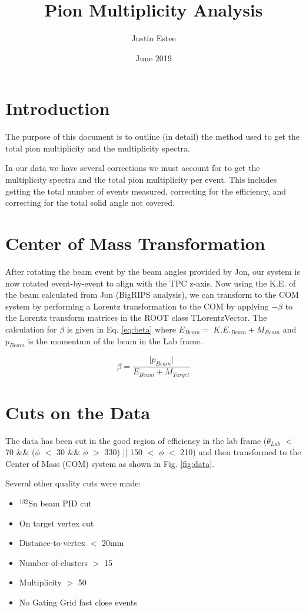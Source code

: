 \documentclass[12pt, letterpaper, twoside]{article}
\title{Pion Multiplicity Analysis}
\author{Justin Estee}
\date{June 2019}
\begin{document}
 
\begin{titlepage}
\maketitle
\end{titlepage}
 
 \section{Introduction}
 The purpose of this document is to outline (in detail) the method used to get the total pion multiplicity and the multiplicity spectra.
 
 In our data we have several corrections we must account for to get the multiplicity spectra and the total pion multiplicity per event. This includes getting the total number of events measured, correcting for the efficiency, and correcting for the total solid angle not covered. 
 
 \section{Center of Mass Transformation}
 After rotating the beam event by the beam angles provided by Jon, our system is now rotated event-by-event to align with the TPC z-axis. Now using the K.E. of the beam calculated from Jon (BigRIPS analysis), we can transform to the COM system by performing a Lorentz transformation to the COM by applying $-\beta$ to the Lorentz transform matrices in the ROOT class TLorentzVector. The calculation for $\beta$ is given in Eq. \ref{eq:beta} where $E_{Beam}=~K.E._{Beam} + M_{Beam}$ and $p_{Beam}$ is the momentum of the beam in the Lab frame. 
 
 \begin{equation}
 \beta = \frac{\vert p_{Beam} \vert}{E_{Beam} + M_{Target}}
 \label{eq:beta}
 \end{equation}
 
 \section{Cuts on the Data}
The data has been cut in the good region of efficiency in the lab frame ($\theta_{Lab}$ $<$ 70 \&\& ($\phi$ $<$ 30 \&\& $\phi$ $>$ 330) $||$ 150 $<$ $\phi$ $<$ 210) and then transformed to the Center of Mass (COM) system as shown in Fig. \ref{fig:data}.

Several other quality cuts were made:
\begin{itemize}
\item ${}^{132}$Sn beam PID cut
\item On target vertex cut
\item Distance-to-vertex $<$ 20mm
\item Number-of-clusters $>$ 15
\item Multiplicity $>$ 50
\item No Gating Grid fast close events
\end{itemize} 
\end{document}

